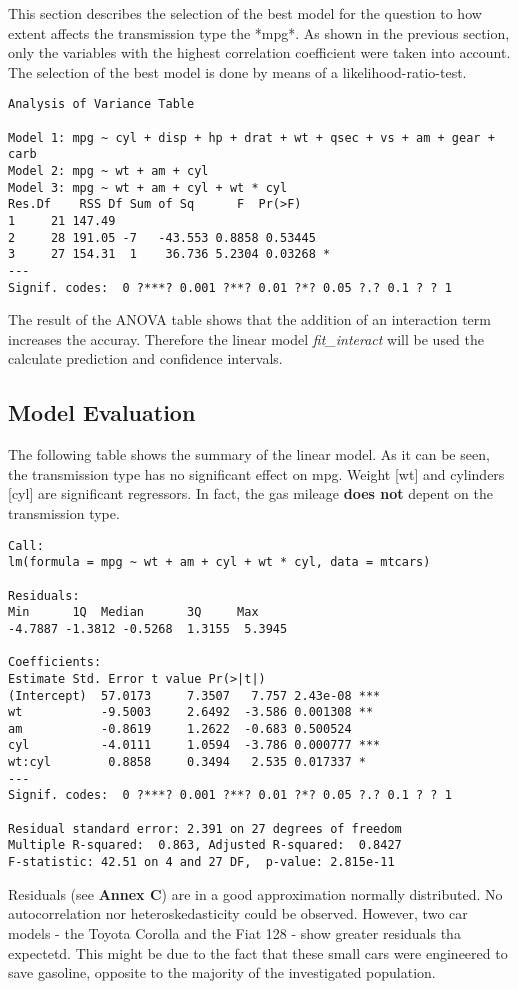 \documentclass[10pt,a4paper]{article}
\begin{document}
This section describes the selection of the best model for the question to how extent affects the transmission type the *mpg*. As shown in the previous section, only the variables with the highest correlation coefficient were taken into account. The selection of the best model is done by means of a likelihood-ratio-test.

\begin{verbatim}
Analysis of Variance Table

Model 1: mpg ~ cyl + disp + hp + drat + wt + qsec + vs + am + gear + carb
Model 2: mpg ~ wt + am + cyl
Model 3: mpg ~ wt + am + cyl + wt * cyl
Res.Df    RSS Df Sum of Sq      F  Pr(>F)  
1     21 147.49                              
2     28 191.05 -7   -43.553 0.8858 0.53445  
3     27 154.31  1    36.736 5.2304 0.03268 *
---
Signif. codes:  0 ?***? 0.001 ?**? 0.01 ?*? 0.05 ?.? 0.1 ? ? 1
\end{verbatim}
The result of the ANOVA table shows that the addition of an interaction term increases the accuray. Therefore the linear model \textit{fit\_interact} will be used the calculate prediction and confidence intervals.

\subsection{Model Evaluation}
The following table shows the summary of the linear model. As it can be seen, the transmission type has no significant effect on mpg. Weight [wt] and cylinders [cyl] are significant regressors. 
In fact, the gas mileage \textbf{does not} depent on the transmission type.
		
\begin{verbatim}
Call:
lm(formula = mpg ~ wt + am + cyl + wt * cyl, data = mtcars)

Residuals:
Min      1Q  Median      3Q     Max 
-4.7887 -1.3812 -0.5268  1.3155  5.3945 

Coefficients:
Estimate Std. Error t value Pr(>|t|)    
(Intercept)  57.0173     7.3507   7.757 2.43e-08 ***
wt           -9.5003     2.6492  -3.586 0.001308 ** 
am           -0.8619     1.2622  -0.683 0.500524    
cyl          -4.0111     1.0594  -3.786 0.000777 ***
wt:cyl        0.8858     0.3494   2.535 0.017337 *  
---
Signif. codes:  0 ?***? 0.001 ?**? 0.01 ?*? 0.05 ?.? 0.1 ? ? 1

Residual standard error: 2.391 on 27 degrees of freedom
Multiple R-squared:  0.863,	Adjusted R-squared:  0.8427 
F-statistic: 42.51 on 4 and 27 DF,  p-value: 2.815e-11
\end{verbatim}		
Residuals (see \textbf{Annex C}) are in a good approximation normally distributed. No autocorrelation nor heteroskedasticity could be observed.
However, two car models - the Toyota Corolla and the Fiat 128 - show greater residuals tha expectetd. This might be due to the fact that these small cars were engineered to save gasoline, opposite to the majority of the investigated population.
\newpage
\appendix
\end{document}
